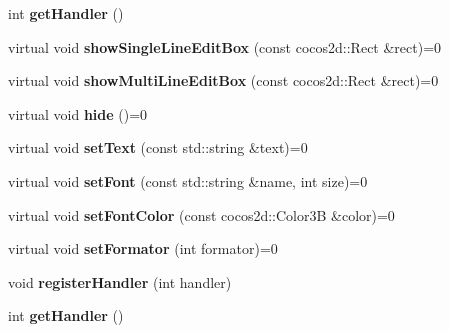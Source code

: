 \begin{DoxyCompactItemize}
int {\bfseries get\+Handler} ()
\item 
\mbox{\label{classPlayerEditBoxServiceProtocol_af2c2dd71c5f64239bcc4dfb428bd5653}} 
virtual void {\bfseries show\+Single\+Line\+Edit\+Box} (const cocos2d\+::\+Rect \&rect)=0
\item 
\mbox{\label{classPlayerEditBoxServiceProtocol_aa70c101ecd43cab1d9c94a01a735a1ba}} 
virtual void {\bfseries show\+Multi\+Line\+Edit\+Box} (const cocos2d\+::\+Rect \&rect)=0
\item 
\mbox{\label{classPlayerEditBoxServiceProtocol_ad8fdc1f38f029c262446126a14d3ebb6}} 
virtual void {\bfseries hide} ()=0
\item 
\mbox{\label{classPlayerEditBoxServiceProtocol_aa3470ad3d165a33ce4eb49fa9204ce73}} 
virtual void {\bfseries set\+Text} (const std\+::string \&text)=0
\item 
\mbox{\label{classPlayerEditBoxServiceProtocol_a0749718d22ad6fa4f11f3885b5198b86}} 
virtual void {\bfseries set\+Font} (const std\+::string \&name, int size)=0
\item 
\mbox{\label{classPlayerEditBoxServiceProtocol_ac5a4d55c93ca0447cec7174e978b8d18}} 
virtual void {\bfseries set\+Font\+Color} (const cocos2d\+::\+Color3B \&color)=0
\item 
\mbox{\label{classPlayerEditBoxServiceProtocol_adceae800a3ef4b73a8a39f6d69025f0e}} 
virtual void {\bfseries set\+Formator} (int formator)=0
\item 
\mbox{\label{classPlayerEditBoxServiceProtocol_a20402c5275385ffb9896050db950ba53}} 
void {\bfseries register\+Handler} (int handler)
\item 
\mbox{\label{classPlayerEditBoxServiceProtocol_ac861d74d983a5eb981c39b5bf35355e6}} 
int {\bfseries get\+Handler} ()
\end{DoxyCompactItemize}
